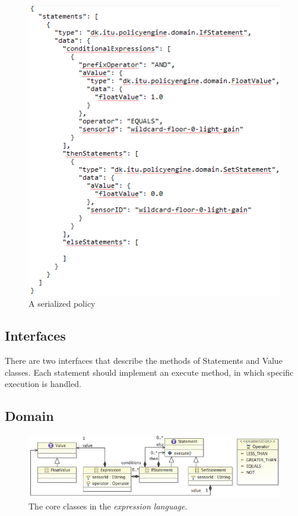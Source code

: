 \begin{figure}
	\centering
    \includegraphics[scale=0.85]{images/json_policy.png} 
	\caption{A serialized policy}
	\label{fig:json_policy}
\end{figure}

\subsection{Interfaces}
There are two interfaces that describe the methods of Statements and Value classes. Each statement should implement an execute method, in which specific execution is handled. 
\subsection{Domain}
\label{s:Domain}
\begin{figure}
	\centering
    \includegraphics[scale=0.55]{chapters/implementation-model-expression-language.png} 
	\caption{The core classes in the \textit{expression language}.}
	\label{fig:ecore-sensors-actuators}
\end{figure}


